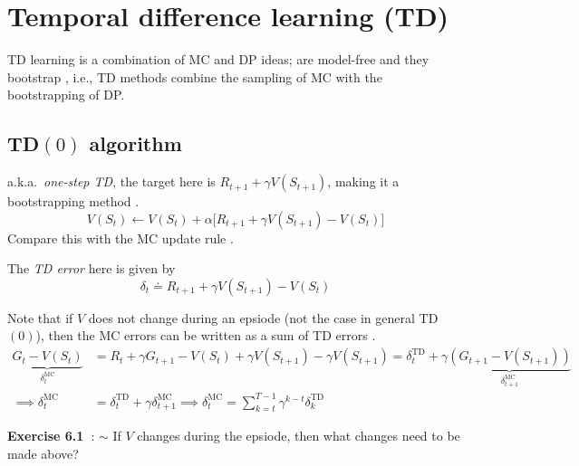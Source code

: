 \section{Temporal difference learning (TD)}

TD learning is a combination of MC and DP ideas; are model-free  and they bootstrap , i.e., TD methods combine the sampling of MC with the bootstrapping of DP.\@

\subsection{TD\texorpdfstring{\( (0) \)}{ (0) } algorithm}

a.k.a.~\textit{one-step TD}, the target here is \( R_{t+1} + \gamma V(S_{t+1}) \), making it a bootstrapping method .
\begin{equation}
    V(S_t) \leftarrow V(S_t) + \alpha \Big[ R_{t+1} + \gamma V(S_{t+1}) - V(S_t) \Big]
\end{equation}
Compare this with the MC update rule .

The \textit{TD error} here is given by
\begin{equation}\label{eq:td-error-TD0}
    \delta_t \doteq R_{t+1} + \gamma V(S_{t+1}) - V(S_t)
\end{equation}

Note that if \( V \) does not change during an epsiode (not the case in general TD\( (0) \)), then the MC errors  can be written as a sum of TD errors .
\begin{align*}
    \underbrace{ G_t - V(S_t) }_{\delta_{t}^{\text{MC}}}
     & =
    R_t + \gamma G_{t+1} - V(S_t) + \gamma V(S_{t+1}) - \gamma V(S_{t+1})
    =
    \delta_{t}^{\text{TD}} + \gamma \underbrace{ (G_{t+1} - V(S_{t+1})) }_{\delta_{t+1}^{\text{MC}}}
    \\
    \implies
    \delta_{t}^{\text{MC}}
     & =
    \delta_{t}^{\text{TD}} + \gamma \delta_{t+1}^{\text{MC}}
    \implies
    \delta_{t}^{\text{MC}}
    =
    \sum_{k = t}^{T-1} \gamma^{k-t} \delta_{k}^{\text{TD}}
\end{align*}

\textbf{Exercise 6.1~\cite{Sutton1998}}:
\( \sim \) If \( V \) changes during the epsiode, then what changes need to be made above?

